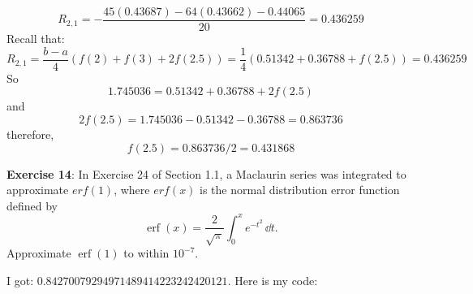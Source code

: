 \documentclass{article}
\begin{document}
\begin{answer}
\begin{equation*}
                R_{2, 1} = -\dfrac{45(0.43687) - 64(0.43662) - 0.44065}{20} = 0.436259
            \end{equation*}
        Recall that:
            \begin{equation*}
                R_{2, 1} = \dfrac{b - a}{4}(f(2) + f(3) + 2f(2.5)) = \dfrac{1}{4}(0.51342 + 0.36788 + f(2.5)) = 0.436259
            \end{equation*}
        So
            \begin{equation*}
                1.745036 = 0.51342 + 0.36788 + 2f(2.5)
            \end{equation*}
        and
            \begin{equation*}
                2f(2.5) = 1.745036 - 0.51342 - 0.36788  = 0.863736
            \end{equation*}
        therefore,
            \begin{equation*}
                f(2.5) = 0.863736 / 2  = 0.431868
            \end{equation*}
    \end{answer}

\textbf{Exercise 14}: In Exercise 24 of Section 1.1, a Maclaurin series was integrated to approximate $erf(1)$, where $erf(x)$ is the normal distribution error function defined by
    \begin{equation*}
        \mathop{erf}(x) = \dfrac{2}{\sqrt{\pi}} \int_{0}^{x} e^{-t^{2}} \, \dd{t}.
    \end{equation*}
Approximate $\mathop{erf}(1)$ to within $10^{-7}$. 
    \begin{answer}
        I got: $0.84270079294971489414223242420121$. Here is my code:
        \inputminted{matlab}{./code/CompositeIntegration/Romberg.m}
        \inputminted{matlab}{./code/script7.m}
    \end{answer}
\end{document}
